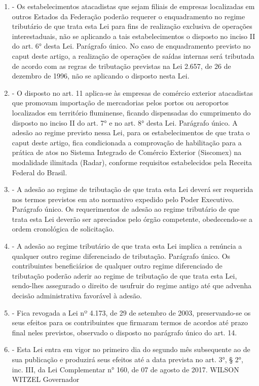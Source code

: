 \documentclass[10pt]{article}
\begin{document}
\begin{enumerate}[label=Art. \arabic*\textdegree]
\item - Os estabelecimentos atacadistas que sejam filiais de empresas localizadas em outros Estados da Federação poderão requerer o enquadramento no regime tributário de que trata esta Lei para fins de realização exclusiva de operações interestaduais, não se aplicando a tais estabelecimentos o disposto no inciso II do art. 6° desta Lei. 
Parágrafo único. No caso de enquadramento previsto no caput deste artigo, a realização de operações de saídas internas será tributada de acordo com as regras de tributação previstas na Lei 2.657, de 26 de dezembro de 1996, não se aplicando o disposto nesta Lei.

\item - O disposto no art. 11 aplica-se às empresas de comércio exterior atacadistas que promovam importação de mercadorias pelos portos ou aeroportos localizados em território fluminense, ficando dispensadas do cumprimento do disposto no inciso II do art. 7° e no art. 8° desta Lei.
Parágrafo único. A adesão ao regime previsto nessa Lei, para os estabelecimentos de que trata o caput deste artigo, fica condicionada a comprovação de habilitação para a prática de atos no Sistema Integrado de Comércio Exterior (Siscomex) na modalidade ilimitada (Radar), conforme requisitos estabelecidos pela Receita Federal do Brasil.

\item - A adesão ao regime de tributação de que trata esta Lei deverá ser requerida nos termos previstos em ato normativo expedido pelo Poder Executivo.
Parágrafo único. Os requerimentos de adesão ao regime tributário de que trata esta Lei deverão ser apreciados pelo órgão competente, obedecendo-se a ordem cronológica de solicitação.

\item - A adesão ao regime tributário de que trata esta Lei implica a renúncia a qualquer outro regime diferenciado de tributação.
Parágrafo único.  Os contribuintes beneficiários de qualquer outro regime diferenciado de tributação poderão aderir ao regime de tributação de que trata esta Lei, sendo-lhes assegurado o direito de usufruir do regime antigo até que advenha decisão administrativa favorável à adesão.

\item - Fica revogada a Lei nº 4.173, de 29 de setembro de 2003, preservando-se os seus efeitos para os contribuintes que firmaram termos de acordos até prazo final neles previstos, observado o disposto no parágrafo único do art. 14.

\item - Esta Lei entra em vigor no primeiro dia do segundo mês subsequente ao de sua publicação e produzirá seus efeitos até a data prevista no art. 3°, § 2°, inc. III, da Lei Complementar n° 160, de 07 de agosto de 2017.
WILSON WITZEL
Governador


\end{enumerate}
\end{document}
